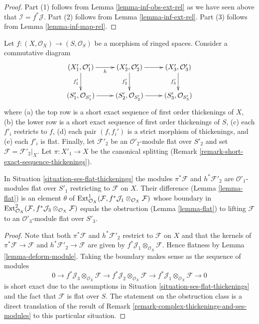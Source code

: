 \begin{proof}
Part (1) follows from Lemma \ref{lemma-inf-obs-ext-rel}
as we have seen above that $\mathcal{I} = f^*\mathcal{J}$.
Part (2) follows from Lemma \ref{lemma-inf-ext-rel}.
Part (3) follows from Lemma \ref{lemma-inf-map-rel}.
\end{proof}

\begin{situation}
\label{situation-ses-flat-thickenings}
Let $f : (X, \mathcal{O}_X) \to (S, \mathcal{O}_S)$ be a morphism of
ringed spaces. Consider a commutative diagram
$$
\xymatrix{
(X'_1, \mathcal{O}'_1) \ar[r]_h \ar[d]_{f'_1} &
(X'_2, \mathcal{O}'_2) \ar[r] \ar[d]_{f'_2} &
(X'_3, \mathcal{O}'_3) \ar[d]_{f'_3} \\
(S'_1, \mathcal{O}_{S'_1}) \ar[r] &
(S'_2, \mathcal{O}_{S'_2}) \ar[r] &
(S'_3, \mathcal{O}_{S'_3})
}
$$
where (a) the top row is a short exact sequence of first order thickenings
of $X$, (b) the lower row is a short exact sequence of first order
thickenings of $S$, (c) each $f'_i$ restricts to $f$, (d) each pair
$(f, f_i')$ is a strict morphism of thickenings, and (e) each $f'_i$ is flat.
Finally, let $\mathcal{F}'_2$ be an $\mathcal{O}'_2$-module flat over
$S'_2$ and set $\mathcal{F} = \mathcal{F}'_2|_X$. Let $\pi : X'_1 \to X$
be the canonical splitting
(Remark \ref{remark-short-exact-sequence-thickenings}).
\end{situation}

\begin{lemma}
\label{lemma-verify-iv}
In Situation \ref{situation-ses-flat-thickenings} the modules
$\pi^*\mathcal{F}$ and $h^*\mathcal{F}'_2$ are $\mathcal{O}'_1$-modules
flat over $S'_1$ restricting to $\mathcal{F}$ on $X$.
Their difference (Lemma \ref{lemma-flat}) is an element
$\theta$ of $\mathop{\mathrm{Ext}}\nolimits^1_{\mathcal{O}_X}(
\mathcal{F}, f^*\mathcal{J}_1 \otimes_{\mathcal{O}_X} \mathcal{F})$
whose boundary in
$\mathop{\mathrm{Ext}}\nolimits^2_{\mathcal{O}_X}(
\mathcal{F}, f^*\mathcal{J}_3 \otimes_{\mathcal{O}_X} \mathcal{F})$
equals the obstruction (Lemma \ref{lemma-flat})
to lifting $\mathcal{F}$ to an $\mathcal{O}'_3$-module flat over $S'_3$.
\end{lemma}

\begin{proof}
Note that both $\pi^*\mathcal{F}$ and $h^*\mathcal{F}'_2$
restrict to $\mathcal{F}$ on $X$ and that the kernels of
$\pi^*\mathcal{F} \to \mathcal{F}$ and $h^*\mathcal{F}'_2 \to \mathcal{F}$
are given by $f^*\mathcal{J}_1 \otimes_{\mathcal{O}_X} \mathcal{F}$.
Hence flatness by Lemma \ref{lemma-deform-module}.
Taking the boundary makes sense as the sequence of modules
$$
0 \to f^*\mathcal{J}_3 \otimes_{\mathcal{O}_X} \mathcal{F} \to
f^*\mathcal{J}_2 \otimes_{\mathcal{O}_X} \mathcal{F} \to
f^*\mathcal{J}_1 \otimes_{\mathcal{O}_X} \mathcal{F} \to 0
$$
is short exact due to the assumptions in
Situation \ref{situation-ses-flat-thickenings}
and the fact that $\mathcal{F}$ is flat over $S$.
The statement on the obstruction class is a direct translation
of the result of
Remark \ref{remark-complex-thickenings-and-ses-modules}
to this particular situation.
\end{proof}






